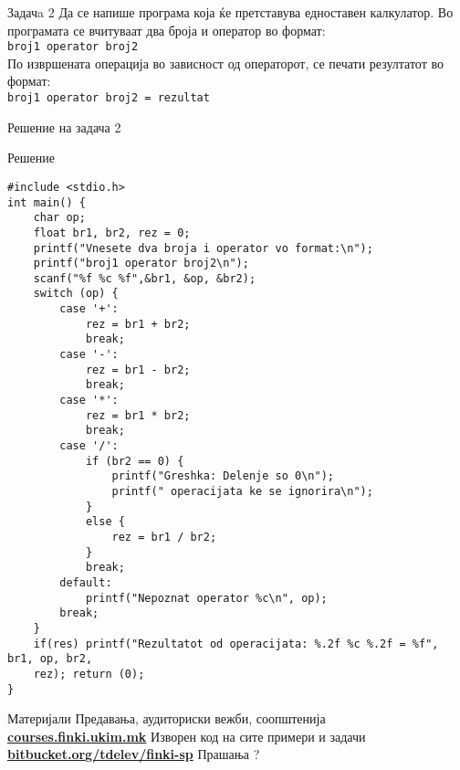 \begin{frame}{Задачa 2}
Да се напише програма која ќе претставува едноставен калкулатор. Во програмата
се вчитуваат два броја и оператор во формат:\\
\texttt{broj1 operator broj2}\\
По извршената операција во зависност од операторот, се печати резултатот во
формат:\\
\texttt{broj1 operator broj2 = rezultat}
\end{frame}

\begin{frame}[fragile,shrink=10]{Решение на задача 2}
\begin{exampleblock}{Решение}
\begin{lstlisting}
#include <stdio.h>
int main() {
    char op;
    float br1, br2, rez = 0;
    printf("Vnesete dva broja i operator vo format:\n");
    printf("broj1 operator broj2\n");
    scanf("%f %c %f",&br1, &op, &br2);
    switch (op) {
        case '+':
            rez = br1 + br2;
            break;
        case '-':
            rez = br1 - br2;
            break;
        case '*':
            rez = br1 * br2;
            break;
        case '/':
            if (br2 == 0) {
                printf("Greshka: Delenje so 0\n");
                printf(" operacijata ke se ignorira\n");
            }
            else {
                rez = br1 / br2;
            }
            break;
        default:
            printf("Nepoznat operator %c\n", op);
        break;
    }
    if(res) printf("Rezultatot od operacijata: %.2f %c %.2f = %f", br1, op, br2,
    rez); return (0);
}
\end{lstlisting}
\end{exampleblock}
\end{frame}

\begin{frame}{Материјали}{}
    Предавања, аудиториски вежби, соопштенија\\
    \href{http://courses.finki.ukim.mk/}{\textbf{courses.finki.ukim.mk}}
    \vfill
    Изворен код на сите примери и задачи\\
    \href{http://bitbucket.org/tdelev/finki-sp/}{\textbf{bitbucket.org/tdelev/finki-sp}}
    \vfill
    {\Huge Прашања ?}
\end{frame}
